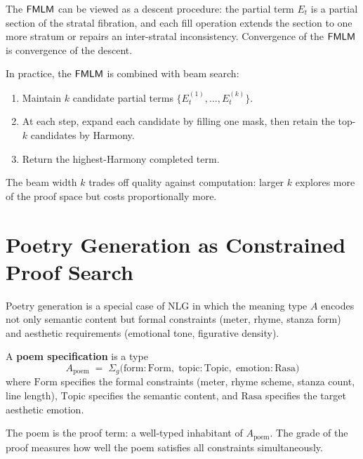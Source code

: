 \begin{remark}
The $\mathsf{FMLM}$ can be viewed as a descent procedure: the partial term
$E_t$ is a partial section of the stratal fibration, and each fill
operation extends the section to one more stratum or repairs an
inter-stratal inconsistency.  Convergence of the $\mathsf{FMLM}$ is
convergence of the descent.
\end{remark}

\begin{construction}
\label{con:beam-search}
In practice, the $\mathsf{FMLM}$ is combined with beam search:
\begin{enumerate}[label=(\alph*)]
\item Maintain $k$ candidate partial terms
  $\{E_t^{(1)}, \ldots, E_t^{(k)}\}$.
\item At each step, expand each candidate by filling one mask, then
  retain the top-$k$ candidates by Harmony.
\item Return the highest-Harmony completed term.
\end{enumerate}
The beam width $k$ trades off quality against computation: larger $k$
explores more of the proof space but costs proportionally more.
\end{construction}

\section{Poetry Generation as Constrained Proof Search}
\label{sec:poetry-generation}

Poetry generation is a special case of NLG in which the meaning type
$A$ encodes not only semantic content but formal constraints (meter,
rhyme, stanza form) and aesthetic requirements (emotional tone,
figurative density).

\begin{definition}
\label{def:poem-spec}
A \textbf{poem specification} is a type
\[
  A_{\mathrm{poem}} \;=\;
  \Sigma_g\bigl(
    \text{form} : \mathrm{Form},\;
    \text{topic} : \mathrm{Topic},\;
    \text{emotion} : \mathrm{Rasa}
  \bigr)
\]
where $\mathrm{Form}$ specifies the formal constraints (meter, rhyme
scheme, stanza count, line length), $\mathrm{Topic}$ specifies the
semantic content, and $\mathrm{Rasa}$ specifies the target aesthetic
emotion.
\end{definition}

The poem is the proof term: a well-typed inhabitant of
$A_{\mathrm{poem}}$.  The grade of the proof measures how well the
poem satisfies all constraints simultaneously.

